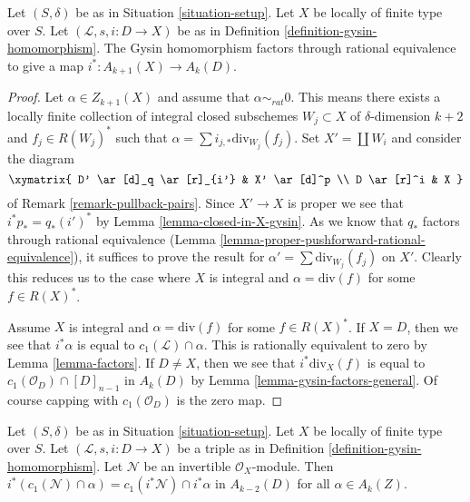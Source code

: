 \begin{lemma}
\label{lemma-gysin-factors}
Let $(S, \delta)$ be as in Situation \ref{situation-setup}.
Let $X$ be locally of finite type over $S$.
Let $(\mathcal{L}, s, i : D \to X)$ be as in
Definition \ref{definition-gysin-homomorphism}.
The Gysin homomorphism factors through rational equivalence to
give a map $i^* : A_{k + 1}(X) \to A_k(D)$.
\end{lemma}

\begin{proof}
Let $\alpha \in Z_{k + 1}(X)$ and assume that $\alpha \sim_{rat} 0$.
This means there exists a locally finite collection of integral
closed subschemes $W_j \subset X$ of $\delta$-dimension $k + 2$
and $f_j \in R(W_j)^*$ such that
$\alpha = \sum i_{j, *}\text{div}_{W_j}(f_j)$.
Set $X' = \coprod W_i$ and consider the diagram
$$
\xymatrix{
D' \ar[d]_q \ar[r]_{i'} & X' \ar[d]^p \\
D \ar[r]^i & X
}
$$
of Remark \ref{remark-pullback-pairs}. Since $X' \to X$ is proper
we see that $i^*p_* = q_*(i')^*$ by Lemma \ref{lemma-closed-in-X-gysin}.
As we know that $q_*$ factors through rational equivalence
(Lemma \ref{lemma-proper-pushforward-rational-equivalence}), it suffices
to prove the result for $\alpha' = \sum \text{div}_{W_j}(f_j)$
on $X'$. Clearly this reduces us to the case where $X$ is integral
and $\alpha = \text{div}(f)$ for some $f \in R(X)^*$.

\medskip\noindent
Assume $X$ is integral and $\alpha = \text{div}(f)$ for some $f \in R(X)^*$.
If $X = D$, then we see that $i^*\alpha$ is equal
to $c_1(\mathcal{L}) \cap \alpha$.
This is rationally equivalent to zero by Lemma \ref{lemma-factors}.
If $D \not = X$, then we see that $i^*\text{div}_X(f)$ is equal to
$c_1(\mathcal{O}_D) \cap [D]_{n - 1}$ in $A_k(D)$ by
Lemma \ref{lemma-gysin-factors-general}. Of course
capping with $c_1(\mathcal{O}_D)$ is the zero map.
\end{proof}

\begin{lemma}
\label{lemma-gysin-commutes-cap-c1}
Let $(S, \delta)$ be as in Situation \ref{situation-setup}. Let $X$ be
locally of finite type over $S$. Let $(\mathcal{L}, s, i : D \to X)$
be a triple as in Definition \ref{definition-gysin-homomorphism}.
Let $\mathcal{N}$ be an invertible $\mathcal{O}_X$-module.
Then $i^*(c_1(\mathcal{N}) \cap \alpha) = c_1(i^*\mathcal{N}) \cap i^*\alpha$
in $A_{k - 2}(D)$ for all $\alpha \in A_k(Z)$.
\end{lemma}

